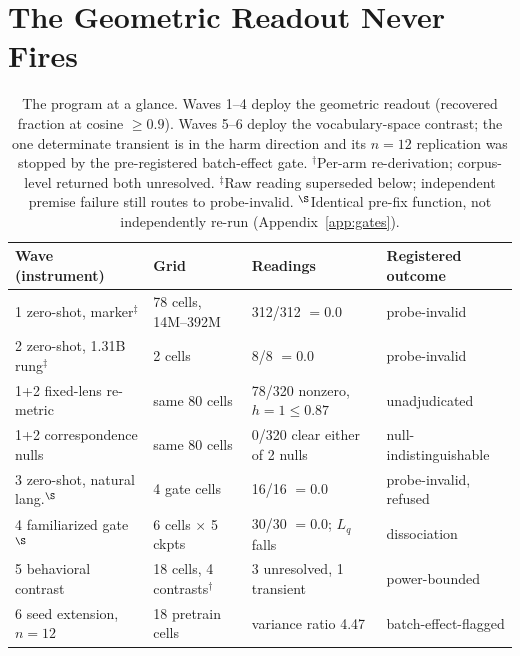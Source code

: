 \section{The Geometric Readout Never Fires}
\label{sec:geometric}

\begin{table}[t]
\centering
\footnotesize
\setlength{\tabcolsep}{3pt}
\begin{tabular}{@{}llll@{}}
\toprule
Wave (instrument) & Grid & Readings & Registered outcome \\
\midrule
1 zero-shot, marker$^{\ddagger}$ & 78 cells, 14M--392M & 312/312 $= 0.0$ & probe-invalid \\ %
2 zero-shot, 1.31B rung$^{\ddagger}$ & 2 cells & 8/8 $= 0.0$ & probe-invalid \\ %
1+2 fixed-lens re-metric & same 80 cells & 78/320 nonzero, $h{=}1{\leq}0.87$ & unadjudicated \\ %
1+2 correspondence nulls & same 80 cells & 0/320 clear either of 2 nulls & null-indistinguishable \\ %
3 zero-shot, natural lang.$^{\S}$ & 4 gate cells & 16/16 $= 0.0$ & probe-invalid, refused \\ %
4 familiarized gate$^{\S}$ & 6 cells $\times$ 5 ckpts & 30/30 $= 0.0$; $L_q$ falls & dissociation \\ %
5 behavioral contrast & 18 cells, 4 contrasts$^{\dagger}$ & 3 unresolved, 1 transient & power-bounded \\ %
6 seed extension, $n{=}12$ & 18 pretrain cells & variance ratio 4.47 & batch-effect-flagged \\ %
\bottomrule
\end{tabular}
\caption{The program at a glance. Waves 1--4 deploy the geometric readout
(recovered fraction at cosine $\geq 0.9$). Waves 5--6 deploy the
vocabulary-space contrast; the one determinate transient is in the harm
direction and its $n{=}12$ replication was stopped by the pre-registered
batch-effect gate.
$^{\dagger}$Per-arm re-derivation; corpus-level returned both unresolved.
$^{\ddagger}$Raw reading superseded below; independent premise failure
still routes to probe-invalid. $^{\S}$Identical pre-fix function, not
independently re-run (Appendix~\ref{app:gates}).}
\label{tab:program}
\end{table}


